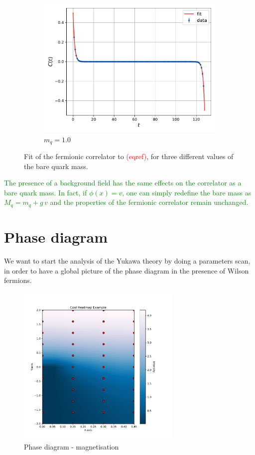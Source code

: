 \begin{figure}
\begin{subfigure}[b]{0.45\textwidth}
        \includegraphics[width=\textwidth]{figures/correlator/corrs_free/corr_big.pdf}
        \caption{$m_q = 1.0$}
    \end{subfigure}
    \caption[Fit of the correlator for free Wilson fermions.]{Fit of the fermionic correlator to \textcolor{red}{(eqref)}, for three different values of the bare quark mass.}
\end{figure}
\textcolor{green}{The presence of a background field has the same effects on the correlator as a bare quark mass. In fact, if $\phi(x) = v$, one can simply redefine the bare mass as $M_q = m_q + g \, v$ and the properties of the fermionic correlator remain unchanged.}
\newpage

\section{Phase diagram}

We want to start the analysis of the Yukawa theory by doing a parameters scan, in order to have a global picture of the phase diagram in the presence of Wilson fermions.
\begin{figure}
    \centering
    \includegraphics[width=0.7\textwidth]{figures/phase_diagram/phi.pdf}
    \caption{Phase diagram - magnetisation}
    \label{fig:phase_diagram_phi}
\end{figure}


